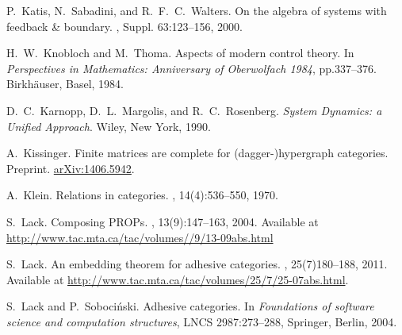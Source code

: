 \begin{thebibliography}{RSW00}
    P.\ Katis, N.\ Sabadini, and R.\ F.\ C.\ Walters.
    \newblock On the algebra of systems with feedback \& boundary.
    ,
    Suppl. { 63}:123--156, 2000.

    H.\ W.\ Knobloch and M.\ Thoma.
    \newblock Aspects of modern control theory. 
      \newblock In {\sl Perspectives in Mathematics: Anniversary of Oberwolfach
      1984}, pp.337--376. Birkh\"auser, Basel, 1984. 


    D.\ C.\ Karnopp, D.\ L.\ Margolis, and R.\ C.\ Rosenberg.
    \newblock \textsl{System Dynamics: a Unified Approach}. Wiley, New York, 1990.

    A.\ Kissinger.
    \newblock Finite matrices are complete for (dagger-)hypergraph categories.
    \newblock Preprint.
    \newblock \href{http://arxiv.org/abs/1406.5942}{arXiv:1406.5942}.

    A.\ Klein. 
    \newblock Relations in categories. 
    , 14(4):536--550, 1970.

    S.\ Lack.
    \newblock Composing PROPs.
    , { 13}(9):147--163,
    2004.
    \newblock Available at
    \href{http://www.tac.mta.ca/tac/volumes/13/9/13-09abs.html}{http://www.tac.mta.ca/tac/volumes//9/13-09abs.html}

    S.\ Lack.
    \newblock An embedding theorem for adhesive categories.
    , 25(7)180--188, 2011.
    \newblock Available at
    \href{http://www.tac.mta.ca/tac/volumes/25/7/25-07abs.html}{http://www.tac.mta.ca/tac/volumes/25/7/25-07abs.html}.

    S.\ Lack and P.\ Soboci\'nski. 
    \newblock Adhesive categories. 
    \newblock In {\em Foundations of software science and computation
    structures}, LNCS 2987:273--288, Springer, Berlin, 2004.
    

\end{thebibliography}
